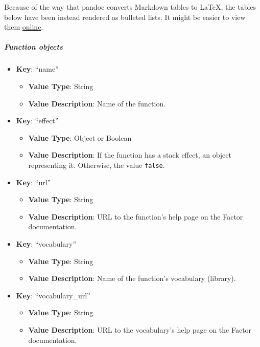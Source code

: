 \documentclass[
]{article}
\begin{document}
Because of the way that pandoc converts Markdown tables to \LaTeX,
the tables below have been instead rendered as bulleted lists. It might be
easier to view them
\href{https://factor.netlify.app/book/about/online-platform/foogle/implementation.md#function-objects}{online}.

\hypertarget{function-objects}{%
\subparagraph{Function objects}\label{function-objects}}

\begin{itemize}
  \item \textbf{Key}: ``name''
    \begin{itemize}
      \item \textbf{Value Type}: String
      \item \textbf{Value Description}: Name of the function.
    \end{itemize}
  \item \textbf{Key}: ``effect''
    \begin{itemize}
      \item \textbf{Value Type}:
        Object or Boolean
      \item \textbf{Value Description}: 
        If the function has a stack effect, an object representing it.
        Otherwise, the value \texttt{false}.
    \end{itemize}
  \item \textbf{Key}: ``url''
    \begin{itemize}
      \item \textbf{Value Type}:
        String
      \item \textbf{Value Description}: 
      URL to the function's help page on the Factor documentation.
    \end{itemize}
  \item \textbf{Key}: ``vocabulary''
    \begin{itemize}
      \item \textbf{Value Type}:
        String
      \item \textbf{Value Description}: 
      Name of the function's vocabulary (library).
    \end{itemize}
  \item \textbf{Key}: ``vocabulary\_url''
    \begin{itemize}
      \item \textbf{Value Type}:
        String
      \item \textbf{Value Description}: 
      URL to the vocabulary's help page on the Factor documentation.
    \end{itemize}
\end{itemize}
\end{document}
